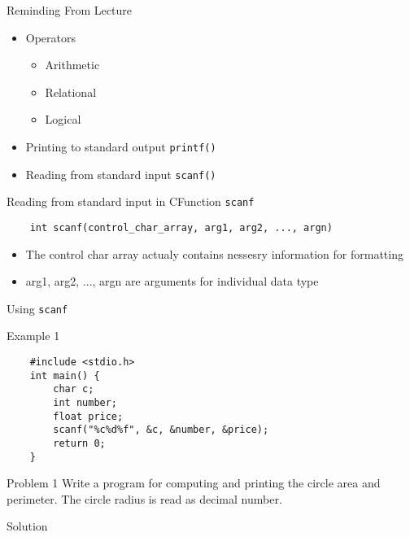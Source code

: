 

\begin{frame}{Reminding From Lecture}
\begin{itemize}
	\item Operators
	\begin{itemize}
		\item Arithmetic
		\item Relational
		\item Logical
	\end{itemize}
	\item Printing to standard output
	\texttt{printf()}
	\item Reading from standard input
	\texttt{scanf()}
\end{itemize}
\end{frame}

\begin{frame}[fragile]{Reading from standard input in C}{Function
\texttt{scanf}}
	\begin{verbatim}
	int scanf(control_char_array, arg1, arg2, ..., argn)	
	\end{verbatim}	
	\begin{itemize}
	\item The control char array actualy contains nessesry information
	for formatting
	\item arg1, arg2, ..., argn are arguments for individual data type
	\end{itemize}	 
\end{frame}

\begin{frame}[fragile]{Using \texttt{scanf}}

	\begin{exampleblock}{Example 1}
	\begin{lstlisting}
	#include <stdio.h>
	int main() {
	    char c;
	    int number;
	    float price;
	    scanf("%c%d%f", &c, &number, &price);
	    return 0;
	}
	\end{lstlisting}
	\end{exampleblock}

\end{frame}

\begin{frame}[fragile]{Problem 1}
Write a program for computing and printing the circle area and perimeter. The
circle radius is read as decimal number.
\begin{exampleblock}{Solution}

\end{exampleblock}
\end{frame}


